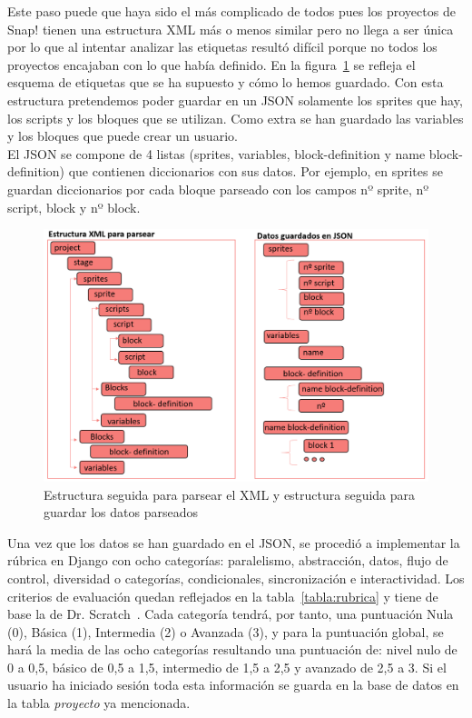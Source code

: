 \documentclass[a4paper, 12pt]{book}
\begin{document}
Este paso puede que haya sido el más complicado de todos pues los proyectos de Snap! tienen una estructura XML más o menos similar pero no llega a ser única por lo que al intentar analizar las etiquetas resultó difícil porque no todos los proyectos encajaban con lo que había definido. En la figura~\ref{figura:tree} se refleja el esquema de etiquetas que se ha supuesto y cómo lo hemos guardado. Con esta estructura pretendemos poder guardar en un JSON solamente los sprites que hay, los scripts y los bloques que se utilizan. Como extra se han guardado las variables y los bloques que puede crear un usuario. \\
El JSON se compone de 4 listas (sprites, variables, block-definition y name block-definition) que contienen diccionarios con sus datos. Por ejemplo, en sprites se guardan diccionarios por cada bloque parseado con los campos nº sprite, nº script, block y nº block.
\\
\begin{figure}[h]
\centering
            \includegraphics[scale=0.52]{img/tree_xml.PNG}
            \caption{Estructura seguida para parsear el XML y estructura seguida para guardar los datos parseados}
            \label{figura:tree}
    \end{figure}
    
Una vez que los datos se han guardado en el JSON, se procedió a implementar la rúbrica en Django con ocho categorías: paralelismo, abstracción, datos, flujo de control, diversidad o categorías, condicionales, sincronización e interactividad. Los criterios de evaluación quedan reflejados en la tabla~\ref{tabla:rubrica} y tiene de base la de Dr. Scratch~\cite{moreno2015dr}. Cada categoría tendrá, por tanto, una puntuación Nula (0), Básica (1), Intermedia (2) o Avanzada (3), y para la puntuación global, se hará la media de las ocho categorías resultando una puntuación de: nivel nulo de 0 a 0,5, básico de 0,5 a 1,5, intermedio de 1,5 a 2,5 y avanzado de 2,5 a 3. Si el usuario ha iniciado sesión toda esta información se guarda en la base de datos en la tabla \textit{proyecto} ya mencionada.
\end{document}
